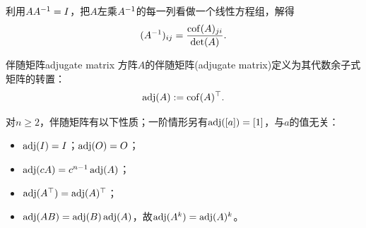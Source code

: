 \begin{corollary}
	利用$AA^{-1} = I$，把$A$左乘$A^{-1}$的每一列看做一个线性方程组，解得
	\begin{equation}\label{eq:la-cofactor-inverse-entries}
		(A^{-1})_{ij} = \frac{\operatorname{cof}(A)_{ji}}{\det(A)}.
	\end{equation}
\end{corollary}
\begin{definition}{伴随矩阵}{adjugate matrix}
	方阵$A$的伴随矩阵(adjugate matrix)定义为其代数余子式矩阵的转置：
	\begin{align}
		\operatorname{adj}(A) := \operatorname{cof}(A)^\top.
	\end{align}
\end{definition}

\begin{corollary}
	对$n \geq 2$，伴随矩阵有以下性质；一阶情形另有$\operatorname{adj}([a]) = [1]$，与$a$的值无关：
	\begin{itemize}
		\item $\operatorname{adj}(I) = I$；$\operatorname{adj}(O) = O$；
		\item $\operatorname{adj}(cA) = c^{n-1}\operatorname{adj}(A)$；
		\item $\operatorname{adj}(A^\top) = \operatorname{adj}(A)^\top$；
		\item $\operatorname{adj}(AB) = \operatorname{adj}(B)\operatorname{adj}(A)$，故$\operatorname{adj}(A^k) = \operatorname{adj}(A)^k$。
	\end{itemize}
\end{corollary}

